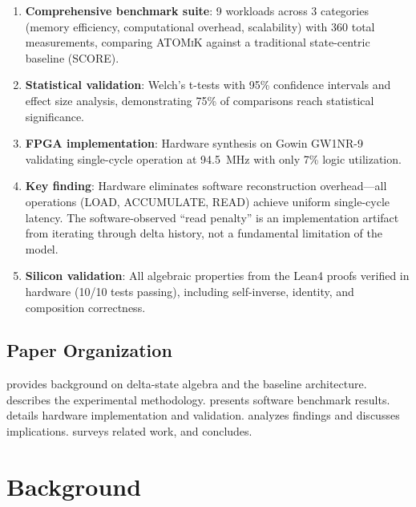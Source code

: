 \documentclass[11pt,letterpaper]{article}
\theoremstyle{plain}
\theoremstyle{definition}
\theoremstyle{remark}
\newcommand{\atomik}{\textsc{ATOMiK}}
\newcommand{\score}{\textsc{SCORE}}
\begin{document}
\begin{enumerate}
    \item \textbf{Comprehensive benchmark suite}: 9 workloads across 3 categories (memory efficiency, computational overhead, scalability) with 360 total measurements, comparing \atomik{} against a traditional state-centric baseline (\score{}).

    \item \textbf{Statistical validation}: Welch's t-tests with 95\% confidence intervals and effect size analysis, demonstrating 75\% of comparisons reach statistical significance.

    \item \textbf{FPGA implementation}: Hardware synthesis on Gowin GW1NR-9 validating single-cycle operation at 94.5~MHz with only 7\% logic utilization.

    \item \textbf{Key finding}: Hardware eliminates software reconstruction overhead---all operations (LOAD, ACCUMULATE, READ) achieve uniform single-cycle latency. The software-observed ``read penalty'' is an implementation artifact from iterating through delta history, not a fundamental limitation of the model.

    \item \textbf{Silicon validation}: All algebraic properties from the Lean4 proofs verified in hardware (10/10 tests passing), including self-inverse, identity, and composition correctness.
\end{enumerate}

\subsection{Paper Organization}

 provides background on delta-state algebra and the baseline architecture.  describes the experimental methodology.  presents software benchmark results.  details hardware implementation and validation.  analyzes findings and discusses implications.  surveys related work, and  concludes.

\section{Background}
\label{sec:background}
\end{document}
